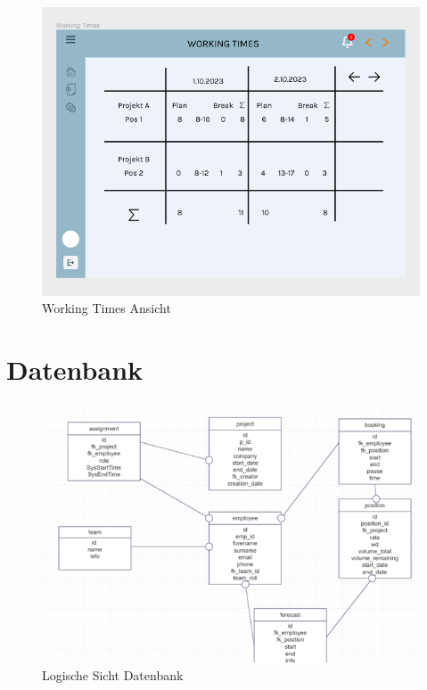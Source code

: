 \documentclass{article}
\begin{document}
        \begin{figure}[h]
            \includegraphics[height= 0.5\textwidth,width= \textwidth]{images/Working Times.png}
            \caption{Working Times Ansicht}
            \label{fig:beispiel}
        \end{figure}
\newpage

\section{Datenbank}

    \begin{figure}[h]
        \centering
        \includegraphics[width= \textwidth]{images/logischeAnsicht.png}
        \caption{Logische Sicht Datenbank}
        \label{fig:beispiel}
    \end{figure}
\end{document}
